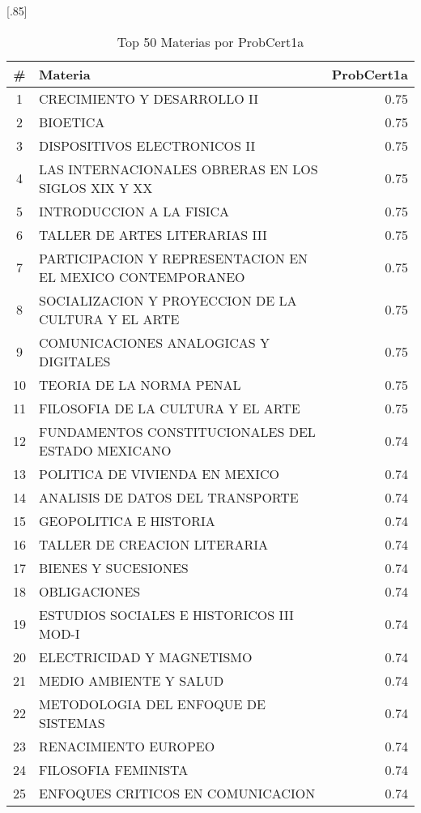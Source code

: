 \documentclass[12pt]{article}
\begin{document}
\begin{table}[ht]
\centering
\scalebox{0.75}[.85]{
\begin{tabular}{clr}
  \hline
   \# & Materia & ProbCert1a \\
  \hline
 1 & CRECIMIENTO Y DESARROLLO II & 0.75 \\
2 & BIOETICA & 0.75 \\
3 & DISPOSITIVOS ELECTRONICOS II & 0.75 \\
4 & LAS INTERNACIONALES OBRERAS EN LOS SIGLOS XIX Y XX & 0.75 \\
5 & INTRODUCCION A LA FISICA & 0.75 \\
6 & TALLER DE ARTES LITERARIAS III & 0.75 \\
7 & PARTICIPACION Y REPRESENTACION EN EL MEXICO CONTEMPORANEO & 0.75 \\
8 & SOCIALIZACION Y PROYECCION DE LA CULTURA Y EL ARTE & 0.75 \\
9 & COMUNICACIONES ANALOGICAS Y DIGITALES & 0.75 \\
10 & TEORIA DE LA NORMA PENAL & 0.75 \\
11 & FILOSOFIA DE LA CULTURA Y EL ARTE & 0.75 \\
12 & FUNDAMENTOS CONSTITUCIONALES DEL ESTADO MEXICANO & 0.74 \\
13 & POLITICA DE VIVIENDA EN MEXICO & 0.74 \\
14 & ANALISIS DE DATOS DEL TRANSPORTE & 0.74 \\
15 & GEOPOLITICA E HISTORIA & 0.74 \\
16 & TALLER DE CREACION LITERARIA & 0.74 \\
17 & BIENES Y SUCESIONES & 0.74 \\
18 & OBLIGACIONES & 0.74 \\
19 & ESTUDIOS SOCIALES E HISTORICOS III MOD-I & 0.74 \\
20 & ELECTRICIDAD Y MAGNETISMO & 0.74 \\
21 & MEDIO AMBIENTE Y SALUD & 0.74 \\
22 & METODOLOGIA DEL ENFOQUE DE SISTEMAS & 0.74 \\
23 & RENACIMIENTO EUROPEO & 0.74 \\
24 & FILOSOFIA FEMINISTA & 0.74 \\
25 & ENFOQUES CRITICOS EN COMUNICACION & 0.74 \\
  \hline
\end{tabular}}
\caption{Top 50 Materias por ProbCert1a}
\end{table}
\end{document}
